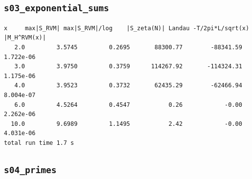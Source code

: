 \documentclass[11pt,reqno]{amsart}
\numberwithin{equation}{section}
\theoremstyle{plain}
\theoremstyle{definition}
\theoremstyle{remark}
\begin{document}
\subsection{\texttt{s03\_exponential\_sums}}
\label{app:out-s03-exponential-sums}

\begin{lstlisting}[style=out]
     x     max|S_RVM| max|S_RVM|/log    |S_zeta(N)| Landau -T/2pi*L/sqrt(x)   |M_H^RVM(x)|
   2.0         3.5745         0.2695       88300.77        -88341.59      1.722e-06
   3.0         3.9750         0.3759      114267.92       -114324.31      1.175e-06
   4.0         3.9523         0.3732       62435.29        -62466.94      8.004e-07
   6.0         4.5264         0.4547           0.26            -0.00      2.262e-06
  10.0         9.6989         1.1495           2.42            -0.00      4.031e-06
total run time 1.7 s
\end{lstlisting}

\subsection{\texttt{s04\_primes}}
\label{app:out-s04-primes}
\end{document}
